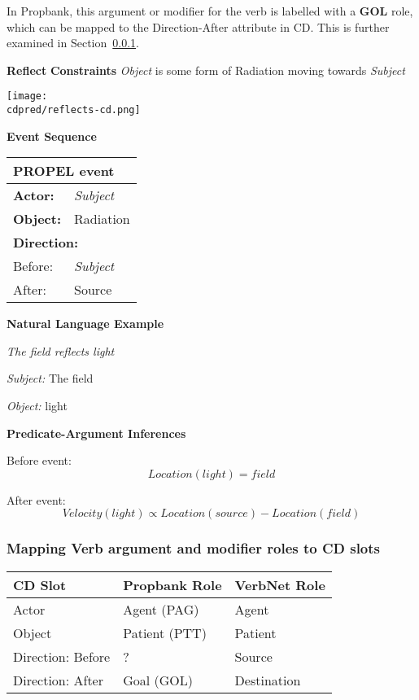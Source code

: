 \documentclass[\mainfile]{subfiles}
\begin{document}
In Propbank, this argument or modifier for the verb is labelled with a \textbf{GOL} role, which can be mapped to the Direction-After attribute in CD. This is further examined in Section~\ref{roles-to-slots}.
\newpage

\textbf{Reflect}
\textbf{Constraints}
\textit{Object} is some form of Radiation moving towards \textit{Subject}
\bigskip

\begin{center}
	\texttt{[image: \\cdpred/reflects-cd.png]}
\end{center}

\textbf{Event Sequence}

\begin{center}
	
	\bigskip
    
    \begin{tabular}{l l}
      \toprule
      \multicolumn{2}{l}{\textbf{PROPEL event}}\\
      \hline
      \textbf{Actor:} & \textit{Subject}\\
      \textbf{Object:} & Radiation\\
      
      \multicolumn{2}{l}{\textbf{Direction:}} \\
      Before: & \textit{Subject}\\
      After: & Source\\
      \bottomrule
    \end{tabular}
    
\end{center}

\textbf{Natural Language Example}

\textit{The field reflects light}

\textit{Subject:} The field

\textit{Object:} light

\bigskip

\textbf{Predicate-Argument Inferences}

Before event:
\[Location(light) = field\]

After event:
\[Velocity(light) \propto Location(source) - Location(field)\]

\subsubsection{Mapping Verb argument and modifier roles to CD slots}
\label{roles-to-slots}

\begin{tabular}{l l l}
  \toprule
  CD Slot & Propbank Role & VerbNet Role \\
  \midrule
  Actor & Agent (PAG) & Agent\\
  Object & Patient (PTT) & Patient\\
  Direction: Before & ? & Source \\
  Direction: After &  Goal (GOL) & Destination \\
  \bottomrule
\end{tabular}
\end{document}
